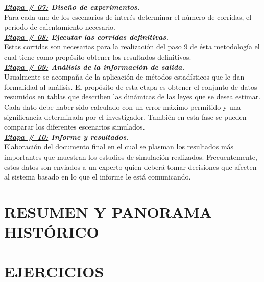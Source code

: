 \textbf{\textit{\underline{Etapa \# 07:} Diseño de experimentos.}}\\

Para cada uno de los escenarios de interés determinar el número de corridas, el periodo de calentamiento necesario.\\

\textbf{\textit{\underline{Etapa \# 08:} Ejecutar las corridas definitivas.}}\\

Estas corridas son necesarias para la realización del paso 9 de ésta metodología el cual tiene como propósito obtener los resultados definitivos.\\

\textbf{\textit{\underline{Etapa \# 09:} Análisis de la información de salida.}}\\

Usualmente se acompaña de la aplicación de métodos estadísticos que le dan formalidad al análisis. El propósito de esta etapa es obtener el conjunto de datos resumidos en tablas que describen las dinámicas de las leyes que se desea estimar. Cada dato debe haber sido calculado con un error máximo permitido y una significancia determinada por el investigador. También en esta fase se pueden comparar los diferentes escenarios simulados.\\

\textbf{\textit{\underline{Etapa \# 10:} Informe y resultados.}}\\

Elaboración del documento final en el cual se plasman los resultados más importantes que muestran
los estudios de simulación realizados. Frecuentemente, estos datos son enviados a un experto quien
deberá tomar decisiones que afecten al sistema basado en lo que el informe le está comunicando.\\

\section{RESUMEN Y PANORAMA HISTÓRICO }\label{sec:ResumenyPanHisoric}
\section{EJERCICIOS}\label{sec:EjerciciosModySimul}

